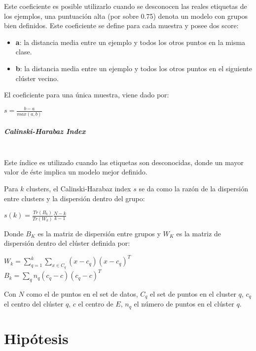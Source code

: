 Este coeficiente es posible utilizarlo cuando se desconocen las reales etiquetas de los ejemplos, una puntuación alta (por sobre 0.75) denota un modelo con grupos bien definidos. Este coeficiente se define para cada muestra y posee dos score:

\begin{itemize}
	
	\item \textbf{a}: la distancia media entre un ejemplo y todos los otros puntos en la misma clase.
	
	\item \textbf{b}: la distancia media entre un ejemplo y todos los otros puntos en el siguiente clúster vecino.
\end{itemize}

El coeficiente para una única muestra, viene dado por:

\begin{center}
	
	$s = \frac{b - a}{max(a, b)}$
\end{center}


\subparagraph{ Calinski-Harabaz Index\\\\}

Este índice es utilizado cuando las etiquetas son desconocidas, donde un mayor valor de éste implica un modelo mejor definido.

Para $k$ clusters, el Calinski-Harabaz index $s$ se da como la razón de la dispersión entre clusters y la dispersión dentro del grupo:

\begin{center}
	$s(k) = \frac{Tr(B_k)}{Tr(W_k)}  \frac{N - k}{k - 1}$
\end{center}


Donde $B_{K}$ es la matriz de dispersión entre grupos y $W_{K}$ es la matriz de dispersión dentro del clúster definida por:

\begin{center}
	
	$W_k = \sum_{q=1}^k \sum_{x \in C_q} (x - c_q) (x - c_q)^T$\\
	$B_k = \sum_q n_q (c_q - c) (c_q - c)^T$
\end{center}

Con $N$ como el de puntos en el set de datos, $C_{q}$ el set de puntos en el cluster $q$, $c_{q}$ el centro del clúster $q$, $c$ el centro de $E$, $n_{q}$ el número de puntos en el clúster $q$.

\section{Hipótesis}

